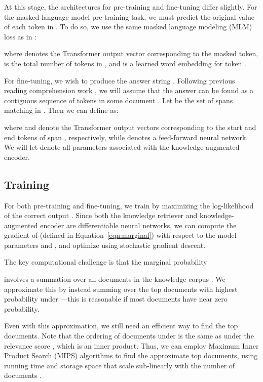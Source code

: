 \documentclass{article}
\begin{document}
At this stage, the architectures for pre-training and fine-tuning differ slightly. For the masked language model pre-training task, we must predict the original value of each \mask token in . To do so, we use the same masked language modeling (MLM) loss as in \citet{bert}:

where  denotes the Transformer output vector corresponding to the  masked token,  is the total number of \mask tokens in , and  is a learned word embedding for token .

For \openqa fine-tuning, we wish to produce the answer string . Following previous reading comprehension work \cite{squad,bidaf,rasor,bidaf_plusplus}, we will assume that the answer  can be found as a contiguous sequence of tokens in some document .
Let  be the set of spans matching  in . Then we can define  as:

where  and  denote the Transformer output vectors corresponding to the start and end tokens of span , respectively, while  denotes a feed-forward neural network. We will let  denote all parameters associated with the knowledge-augmented encoder.

\subsection{Training}
\label{sec:training}

For both pre-training and fine-tuning, we train by maximizing the log-likelihood  of the correct output . Since both the knowledge retriever and knowledge-augmented encoder are differentiable neural networks, we can compute the gradient of  (defined in Equation~\ref{eqn:marginal}) with respect to the model parameters  and , and optimize using stochastic gradient descent.

The key computational challenge is that the marginal probability

involves a summation over all documents  in the knowledge corpus . We approximate this by instead summing over the top  documents with highest probability under ---this is reasonable if most documents have near zero probability.

Even with this approximation, we still need an efficient way to find the top  documents. Note that the ordering of documents under  is the same as under the relevance score , which is an inner product. Thus, we can employ Maximum Inner Product Search (MIPS) algorithms to find the approximate top  documents, using running time and storage space that scale sub-linearly with the number of documents \cite{mips_cone,mips_alsh,mips_binary}.
\end{document}

